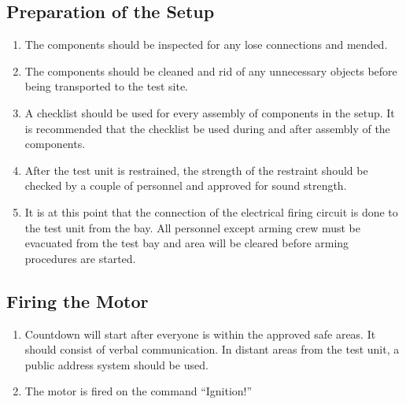 \documentclass[12pt,letterpaper]{article}
\begin{document}
        \subsection{Preparation of the Setup}
            \begin{enumerate}
                 \begin{enumerate}
                     \item The components should be inspected for any lose
                     connections and mended. 
                     \item The components should be cleaned and rid of any
                     unnecessary objects before being transported to the test
                     site. 
                     \item A checklist should be used for every assembly of
                     components in the setup. It is recommended that the
                     checklist be used during and after assembly of the
                     components. 
                     \item After the test unit is restrained, the strength
                     of the restraint should be checked by a couple of
                     personnel and approved for sound strength. 
                     \item It is at this point that the connection of the
                     electrical firing circuit is done to the test unit
                     from the bay. All personnel except arming crew must be
                     evacuated from the test bay and area will be cleared
                     before arming procedures are started.
                 \end{enumerate}
            \end{enumerate}
        \subsection{Firing the Motor}
            \begin{enumerate}
                \begin{enumerate}
                    \item Countdown will start after everyone is within the
                    approved safe areas. It should consist of verbal communication.
                    In distant areas from the test unit, a public address system
                    should be used. 
                    \item The motor is fired on the command “Ignition!”
                \end{enumerate}
            \end{enumerate}
\end{document}

